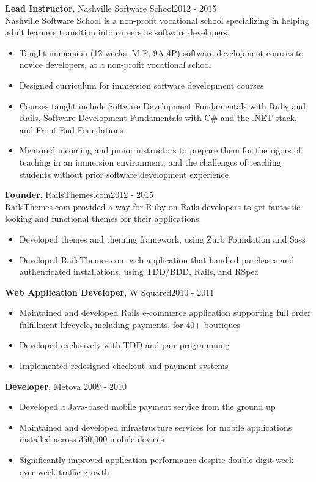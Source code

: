 \documentclass[line, margin, 10pt]{res}
\begin{document}
\begin{resume}
{\bf Lead Instructor}, Nashville Software School\hfill 2012 - 2015\\
Nashville Software School is a non-profit vocational school specializing in helping adult learners transition into careers as software developers.
\begin{itemize} \itemsep -2pt  %
  \item Taught immersion (12 weeks, M-F, 9A-4P) software development courses to novice developers, at a non-profit vocational school
  \item Designed curriculum for immersion software development courses
  \item Courses taught include Software Development Fundamentals with Ruby and Rails, Software Development Fundamentals with C\# and the .NET stack, and Front-End Foundations
  \item Mentored incoming and junior instructors to prepare them for the rigors of teaching in an immersion environment, and the challenges of teaching students without prior software development experience
\end{itemize}

{\bf Founder}, RailsThemes.com\hfill 2012 - 2015\\
RailsThemes.com provided a way for Ruby on Rails developers to get fantastic-looking and functional themes for their applications.
\begin{itemize} \itemsep -2pt  %
    \item Developed themes and theming framework, using Zurb Foundation and Sass
    \item Developed RailsThemes.com web application that handled purchases and authenticated installations, using TDD/BDD, Rails, and RSpec
\end{itemize}

{\bf Web Application Developer}, W Squared\hfill 2010 - 2011
\begin{itemize} \itemsep -2pt
\item Maintained and developed Rails e-commerce application supporting full order fulfillment lifecycle, including payments, for 40+ boutiques
\item Developed exclusively with TDD and pair programming
\item Implemented redesigned checkout and payment systems
\end{itemize}

{\bf Developer}, Metova \hfill 2009 - 2010
\begin{itemize} \itemsep -2pt
\item Developed a Java-based mobile payment service from the ground up
\item Maintained and developed infrastructure services for mobile applications installed across 350,000 mobile devices
\item Significantly improved application performance despite double-digit week-over-week traffic growth
\end{itemize}


\end{resume}
\end{document}

